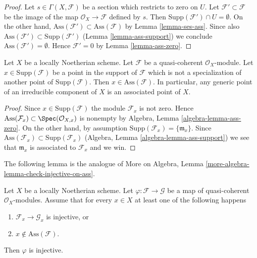 \begin{proof}
Let $s \in \Gamma(X, \mathcal{F})$ be a section which restricts to zero on $U$.
Let $\mathcal{F}' \subset \mathcal{F}$ be the image of the map
$\mathcal{O}_X \to \mathcal{F}$ defined by $s$. Then
$\text{Supp}(\mathcal{F}') \cap U = \emptyset$. On the other hand,
$\text{Ass}(\mathcal{F}') \subset \text{Ass}(\mathcal{F})$
by Lemma \ref{lemma-ses-ass}. Since also
$\text{Ass}(\mathcal{F}') \subset \text{Supp}(\mathcal{F}')$
(Lemma \ref{lemma-ass-support}) we conclude
$\text{Ass}(\mathcal{F}') = \emptyset$.
Hence $\mathcal{F}' = 0$ by Lemma \ref{lemma-ass-zero}.
\end{proof}

\begin{lemma}
\label{lemma-minimal-support-in-ass}
Let $X$ be a locally Noetherian scheme.
Let $\mathcal{F}$ be a quasi-coherent $\mathcal{O}_X$-module.
Let $x \in \text{Supp}(\mathcal{F})$ be a point in the support
of $\mathcal{F}$ which is not a specialization of another point of
$\text{Supp}(\mathcal{F})$. Then $x \in \text{Ass}(\mathcal{F})$.
In particular, any generic point of an irreducible component of $X$
is an associated point of $X$.
\end{lemma}

\begin{proof}
Since $x \in \text{Supp}(\mathcal{F})$ the module $\mathcal{F}_x$
is not zero. Hence
$\text{Ass}(\mathcal{F}_x) \subset \Spec(\mathcal{O}_{X, x})$
is nonempty by
Algebra, Lemma \ref{algebra-lemma-ass-zero}.
On the other hand, by assumption
$\text{Supp}(\mathcal{F}_x) = \{\mathfrak m_x\}$.
Since
$\text{Ass}(\mathcal{F}_x) \subset \text{Supp}(\mathcal{F}_x)$
(Algebra, Lemma \ref{algebra-lemma-ass-support})
we see that $\mathfrak m_x$ is associated to $\mathcal{F}_x$
and we win.
\end{proof}

\noindent
The following lemma is the analogue of
More on Algebra, Lemma \ref{more-algebra-lemma-check-injective-on-ass}.

\begin{lemma}
\label{lemma-check-injective-on-ass}
Let $X$ be a locally Noetherian scheme. Let
$\varphi : \mathcal{F} \to \mathcal{G}$ be a map of
quasi-coherent $\mathcal{O}_X$-modules.
Assume that for every $x \in X$
at least one of the following happens
\begin{enumerate}
\item $\mathcal{F}_x \to \mathcal{G}_x$ is injective, or
\item $x \not \in \text{Ass}(\mathcal{F})$.
\end{enumerate}
Then $\varphi$ is injective.
\end{lemma}

